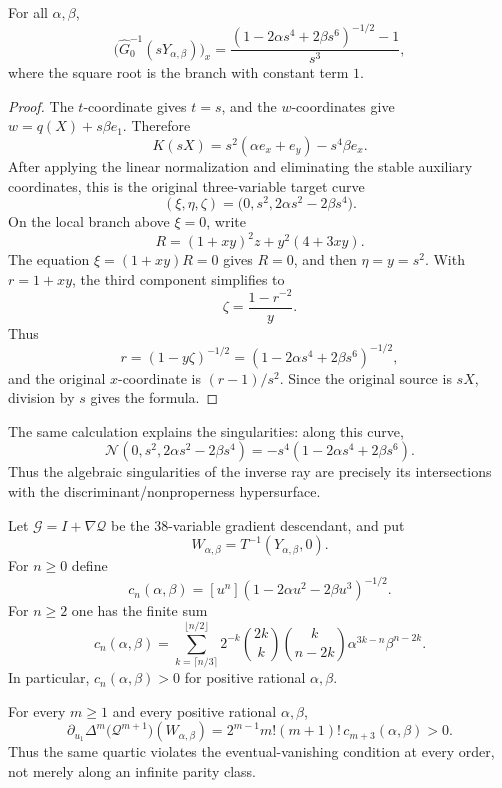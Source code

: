 \begin{theorem}
\label{thm:inverse-ray-family}
For all $\alpha,\beta$,
\[
\bigl(\widehat G^{-1}_0(sY_{\alpha,\beta})\bigr)_x
 =\frac{(1-2\alpha s^4+2\beta s^6)^{-1/2}-1}{s^3},
\]
where the square root is the branch with constant term $1$.
\end{theorem}

\begin{proof}
The $t$-coordinate gives $t=s$, and the $w$-coordinates give
$w=q(X)+s\beta e_1$.  Therefore
\[
K(sX)=s^2(\alpha e_x+e_y)-s^4\beta e_x.
\]
After applying the linear normalization and eliminating the stable auxiliary
coordinates, this is the original three-variable target curve
\[
(\xi,\eta,\zeta)
  =\bigl(0,s^2,2\alpha s^2-2\beta s^4\bigr).
\]
On the local branch above $\xi=0$, write
\[
R=(1+xy)^2z+y^2(4+3xy).
\]
The equation $\xi=(1+xy)R=0$ gives $R=0$, and then $\eta=y=s^2$.  With
$r=1+xy$, the third component simplifies to
\[
\zeta=\frac{1-r^{-2}}{y}.
\]
Thus
\[
r=(1-y\zeta)^{-1/2}
  =(1-2\alpha s^4+2\beta s^6)^{-1/2},
\]
and the original $x$-coordinate is $(r-1)/s^2$.  Since the original source is
$sX$, division by $s$ gives the formula.
\end{proof}

The same calculation explains the singularities: along this curve,
\[
\mathscr N(0,s^2,2\alpha s^2-2\beta s^4)
 =-s^4(1-2\alpha s^4+2\beta s^6).
\]
Thus the algebraic singularities of the inverse ray are precisely its
intersections with the discriminant/nonproperness hypersurface.

Let $\mathcal G=I+\nabla\mathcal Q$ be the $38$-variable gradient descendant,
and put
\[
W_{\alpha,\beta}=T^{-1}(Y_{\alpha,\beta},0).
\]
For $n\ge0$ define
\[
c_n(\alpha,\beta)
 =[u^n](1-2\alpha u^2-2\beta u^3)^{-1/2}.
\]
For $n\ge2$ one has the finite sum
\begin{equation}
\label{eq:positive-cn}
c_n(\alpha,\beta)
 =\sum_{k=\lceil n/3\rceil}^{\lfloor n/2\rfloor}
 2^{-k}\binom{2k}{k}\binom{k}{n-2k}
 \alpha^{3k-n}\beta^{n-2k}.
\end{equation}
In particular, $c_n(\alpha,\beta)>0$ for positive rational
$\alpha,\beta$.

\begin{theorem}
\label{thm:all-order-laplacian}
For every $m\ge1$ and every positive rational $\alpha,\beta$,
\[
\partial_{u_1}\Delta^m\bigl(\mathcal Q^{m+1}\bigr)
   (W_{\alpha,\beta})
 =2^{m-1}m!(m+1)!\,c_{m+3}(\alpha,\beta)>0.
\]
Thus the same quartic violates the eventual-vanishing condition at every
order, not merely along an infinite parity class.
\end{theorem}

